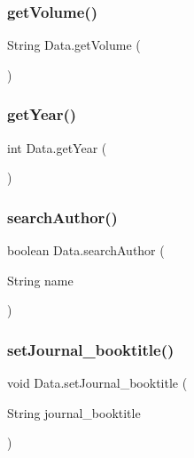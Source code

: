 \hypertarget{class_data_a57d3cdf8d58ca9761c9c1873a352ad9e}{}\label{class_data_a57d3cdf8d58ca9761c9c1873a352ad9e} 
\subsubsection{\texorpdfstring{get\+Volume()}{getVolume()}}
{\footnotesize\ttfamily String Data.\+get\+Volume (\begin{DoxyParamCaption}{ }\end{DoxyParamCaption})}

\hypertarget{class_data_afd9f8a0a7ddf04b40ac2c6a038f61e68}{}\label{class_data_afd9f8a0a7ddf04b40ac2c6a038f61e68} 
\subsubsection{\texorpdfstring{get\+Year()}{getYear()}}
{\footnotesize\ttfamily int Data.\+get\+Year (\begin{DoxyParamCaption}{ }\end{DoxyParamCaption})}

\hypertarget{class_data_a457cf5a872b2a05dd0b5b14db53dceed}{}\label{class_data_a457cf5a872b2a05dd0b5b14db53dceed} 
\subsubsection{\texorpdfstring{search\+Author()}{searchAuthor()}}
{\footnotesize\ttfamily boolean Data.\+search\+Author (\begin{DoxyParamCaption}\item[{String}]{name }\end{DoxyParamCaption})}

\hypertarget{class_data_a18f402932ef14e0f351e9419def6d840}{}\label{class_data_a18f402932ef14e0f351e9419def6d840} 
\subsubsection{\texorpdfstring{set\+Journal\+\_\+booktitle()}{setJournal\_booktitle()}}
{\footnotesize\ttfamily void Data.\+set\+Journal\+\_\+booktitle (\begin{DoxyParamCaption}\item[{String}]{journal\+\_\+booktitle }\end{DoxyParamCaption})}

